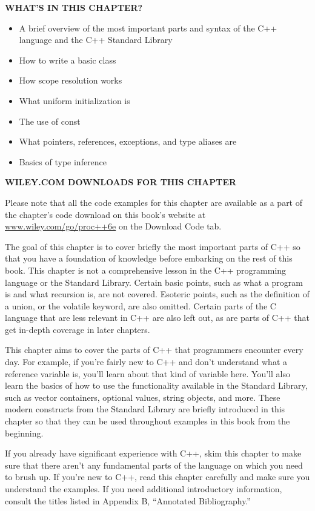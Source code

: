 \noindent
\textbf{WHAT’S IN THIS CHAPTER?}

\begin{itemize}
\item
A brief overview of the most important parts and syntax of the C++ language and the C++ Standard Library

\item
How to write a basic class

\item
How scope resolution works

\item
What uniform initialization is

\item
The use of const

\item
What pointers, references, exceptions, and type aliases are

\item
Basics of type inference
\end{itemize}

\noindent
\textbf{WILEY.COM DOWNLOADS FOR THIS CHAPTER}

Please note that all the code examples for this chapter are available as a part of the chapter’s code download on this book’s website at \url{www.wiley.com/go/proc++6e} on the Download Code tab.

The goal of this chapter is to cover briefly the most important parts of C++ so that you have a foundation of knowledge before embarking on the rest of this book. This chapter is not a comprehensive lesson in the C++ programming language or the Standard Library. Certain basic points, such as what a program is and what recursion is, are not covered. Esoteric points, such as the definition of a union, or the volatile keyword, are also omitted. Certain parts of the C language that are less relevant in C++ are also left out, as are parts of C++ that get in-depth coverage in later chapters.

This chapter aims to cover the parts of C++ that programmers encounter every day. For example, if you’re fairly new to C++ and don’t understand what a reference variable is, you’ll learn about that kind of variable here. You’ll also learn the basics of how to use the functionality available in the Standard Library, such as vector containers, optional values, string objects, and more. These modern constructs from the Standard Library are briefly introduced in this chapter so that they can be used throughout examples in this book from the beginning.

If you already have significant experience with C++, skim this chapter to make sure that there aren’t any fundamental parts of the language on which you need to brush up. If you’re new to C++, read this chapter carefully and make sure you understand the examples. If you need additional introductory information, consult the titles listed in Appendix B, “Annotated Bibliography.”








